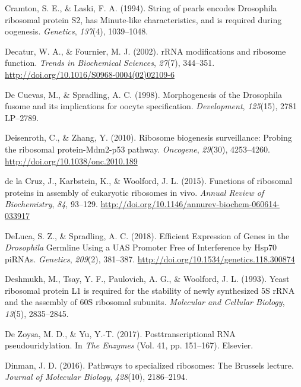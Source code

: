 \documentclass[12pt,oneside]{reedthesis}
\newlength{\cslhangindent}
\newenvironment{cslreferences}%
  {\setlength{\parindent}{0pt}%
  \everypar{\setlength{\hangindent}{\cslhangindent}}\ignorespaces}%
  {\par}
\begin{document}
\begin{cslreferences}
\leavevmode\hypertarget{ref-Cramton1994a}{}%
Cramton, S. E., \& Laski, F. A. (1994). String of pearls encodes Drosophila ribosomal protein S2, has Minute-like characteristics, and is required during oogenesis. \emph{Genetics}, \emph{137}(4), 1039--1048.

\leavevmode\hypertarget{ref-Decatur2002b}{}%
Decatur, W. A., \& Fournier, M. J. (2002). rRNA modifications and ribosome function. \emph{Trends in Biochemical Sciences}, \emph{27}(7), 344--351. \url{http://doi.org/10.1016/S0968-0004(02)02109-6}

\leavevmode\hypertarget{ref-DeCuevas1998f}{}%
De Cuevas, M., \& Spradling, A. C. (1998). Morphogenesis of the Drosophila fusome and its implications for oocyte specification. \emph{Development}, \emph{125}(15), 2781 LP--2789.

\leavevmode\hypertarget{ref-Deisenroth2010e}{}%
Deisenroth, C., \& Zhang, Y. (2010). Ribosome biogenesis surveillance: Probing the ribosomal protein-Mdm2-p53 pathway. \emph{Oncogene}, \emph{29}(30), 4253--4260. \url{http://doi.org/10.1038/onc.2010.189}

\leavevmode\hypertarget{ref-delacruzFunctionsRibosomalProteins2015}{}%
de la Cruz, J., Karbstein, K., \& Woolford, J. L. (2015). Functions of ribosomal proteins in assembly of eukaryotic ribosomes in vivo. \emph{Annual Review of Biochemistry}, \emph{84}, 93--129. \url{http://doi.org/10.1146/annurev-biochem-060614-033917}

\leavevmode\hypertarget{ref-delucaEfficientExpressionGenes2018}{}%
DeLuca, S. Z., \& Spradling, A. C. (2018). Efficient Expression of Genes in the \emph{Drosophila} Germline Using a UAS Promoter Free of Interference by Hsp70 piRNAs. \emph{Genetics}, \emph{209}(2), 381--387. \url{http://doi.org/10.1534/genetics.118.300874}

\leavevmode\hypertarget{ref-Deshmukh1993a}{}%
Deshmukh, M., Tsay, Y. F., Paulovich, A. G., \& Woolford, J. L. (1993). Yeast ribosomal protein L1 is required for the stability of newly synthesized 5S rRNA and the assembly of 60S ribosomal subunits. \emph{Molecular and Cellular Biology}, \emph{13}(5), 2835--2845.

\leavevmode\hypertarget{ref-DeZoysa2017}{}%
De Zoysa, M. D., \& Yu, Y.-T. (2017). Posttranscriptional RNA pseudouridylation. In \emph{The Enzymes} (Vol. 41, pp. 151--167). Elsevier.

\leavevmode\hypertarget{ref-Dinman2016a}{}%
Dinman, J. D. (2016). Pathways to specialized ribosomes: The Brussels lecture. \emph{Journal of Molecular Biology}, \emph{428}(10), 2186--2194.


\end{cslreferences}
\end{document}
